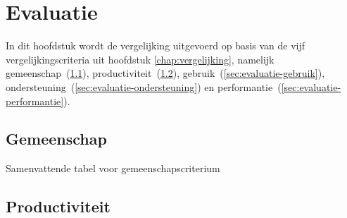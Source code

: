 \chapter{Evaluatie}
\label{chap:evaluatie}

In dit hoofdstuk wordt de vergelijking uitgevoerd op basis van de vijf vergelijkingscriteria uit hoofdstuk \ref{chap:vergelijking}, namelijk gemeenschap~(\ref{sec:evaluatie-gemeenschap}), productiviteit~(\ref{sec:evaluatie-productiviteit}), gebruik~(\ref{sec:evaluatie-gebruik}), ondersteuning~(\ref{sec:evaluatie-ondersteuning}) en performantie~(\ref{sec:evaluatie-performantie}). 


\section{Gemeenschap}
\label{sec:evaluatie-gemeenschap}



\begin{table}[H]
\centering
{}
\caption{Samenvattende tabel voor gemeenschapscriterium}
\label{tabel:evaluatie-gemeenschap}
\end{table}

\section{Productiviteit}
\label{sec:evaluatie-productiviteit}

